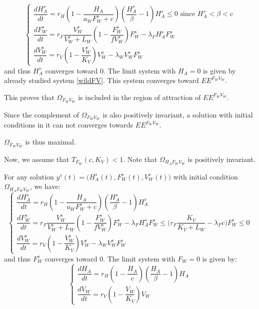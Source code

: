 \documentclass{article}
\newcommand{\lfw}{\lambda_{F}}
\newcommand{\lfv}{\lambda_{W}}
\begin{document}
\begin{equation}
\left\{ \begin{array}{l}
\dfrac{dH_A^s}{dt}= r_{H}\left(1-\dfrac{H_A}{a_WF_W^s + c}\right)\left(\dfrac{H_A^s}{\beta}-1\right)H_A^s \leq 0 \text{ since $H_A^s < \beta < c$} \\
\dfrac{dF_W^s}{dt} = r_F \dfrac{V_W^s}{V_W^s + L_W} \left(1 - \dfrac{F_W^s}{f V_W^s}\right) F_W^s - \lfw H_A^s F_W^s\\
\dfrac{dV_W^s}{dt} = r_V \left(1 - \dfrac{V_W^s}{K_V}\right) V_W^s - \lfv V_W^s F_W^s 
\end{array}\right.
\end{equation} 
and thus $H_A^s$ converges toward $0$. The limit system with $H_A = 0$ is given by already studied system \eqref{wildFV}. This system converges toward $EE^{F_WV_W}$.

This proves that $\Omega_{F_WV_W}$ is included in the region of attraction of $EE^{F_WV_W}$.


Since the complement of $\Omega_{F_WV_W}$ is also positively invariant, a solution with initial conditions in it can not converges towards $EE^{F_WV_W}$.

$\Omega_{F_WV_W}$ is thus maximal.

\bigskip

Now, we assume that $T_{F_W}(c, K_V) < 1$. Note that $\Omega_{H_AF_WV_W}$ is positively invariant.

For any solution $y^s(t) = \Big(H_A^s(t), F_W^s(t), V_W^s(t)\Big)$ with initial condition $\Omega_{H_AF_WV_W}$, we have:
\begin{equation}
\left\{ \begin{array}{l}
\dfrac{dH_A^s}{dt}= r_{H}\left(1-\dfrac{H_A}{a_WF_W^s + c}\right)\left(\dfrac{H_A^s}{\beta}-1\right)H_A^s \\
\dfrac{dF_W^s}{dt} = r_F \dfrac{V_W^s}{V_W^s + L_W} \left(1 - \dfrac{F_W^s}{f V_W^s}\right) F_W^s - \lfw H_A^s F_W^s \leq \Big(r_F \dfrac{K_V}{K_V + L_W} - \lfw c \Big)F^s_W \leq 0 \\
\dfrac{dV_W^s}{dt} = r_V \left(1 - \dfrac{V_W^s}{K_V}\right) V_W^s - \lfv V_W^s F_W^s 
\end{array}\right.
\end{equation} 
and thus $F_W^s$ converges toward $0$. The limit system with $F_W = 0$ is given by:
\begin{equation*}
\left\{ \begin{array}{l}
\dfrac{dH_A}{dt}= r_{H}\left(1-\dfrac{H_A}{c}\right)\left(\dfrac{H_A}{\beta}-1\right)H_A \\
\dfrac{dV_W}{dt} = r_V \left(1 - \dfrac{V_W}{K_V}\right) V_W
\end{array}\right.
\end{equation*} 
\end{document}
